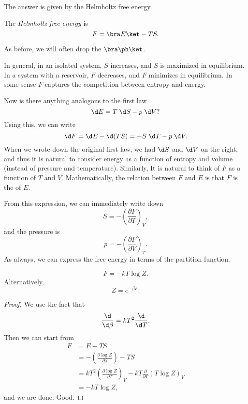 \documentclass[a4paper]{article}
\begin{document}
The answer is given by the Helmholtz free energy.
\begin{defi}
  The \emph{Helmholtz free energy} is
  \[
    F = \bra E\ket - TS.
  \]
\end{defi}
As before, we will often drop the $\bra\ph\ket$.

In general, in an isolated system, $S$ increases, and $S$ is maximized in equilibrium. In a system with a reservoir, $F$ decreases, and $F$ minimizes in equilibrium. In some sense $F$ captures the competition between entropy and energy.

Now is there anything analogous to the first law
\[
  \d E = T\; \d S - p\; \d V?
\]
 Using this, we can write
\[
  \d F = \d E - \d(TS) = -S\; \d T - p\; \d V.
\]
When we wrote down the original first law, we had $\d S$ and $\d V$ on the right, and thus it is natural to consider energy as a function of entropy and volume (instead of pressure and temperature). Similarly, It is natural to think of $F$ as a function of $T$ and $V$. Mathematically, the relation between $F$ and $E$ is that $F$ is the  of $E$.

From this expression, we can immediately write down
\[
  S = - \left(\frac{\partial F}{\partial T}\right)_V,
\]
and the pressure is
\[
  p = -\left(\frac{\partial F}{\partial V}\right)_T.
\]
As always, we can express the free energy in terms of the partition function.
\begin{prop}
  \[
    F = -kT \log Z.
  \]
  Alternatively,
  \[
    Z = e^{-\beta F}.
  \]
\end{prop}

\begin{proof}
  We use the fact that
  \[
    \frac{\d}{\d \beta} = kT^2 \frac{\d}{\d T}.
  \]
  Then we can start from
  \begin{align*}
    F &= E - TS \\
    &= - \left(\frac{\partial \log Z}{\partial \beta}\right) - TS \\
    &= kT^2 \left(\frac{\partial \log Z}{\partial T}\right)_V - kT \frac{\partial}{\partial T}(T \log Z)_V\\
    &= -k T \log Z,
  \end{align*}
  and we are done. Good.
\end{proof}
\end{document}
